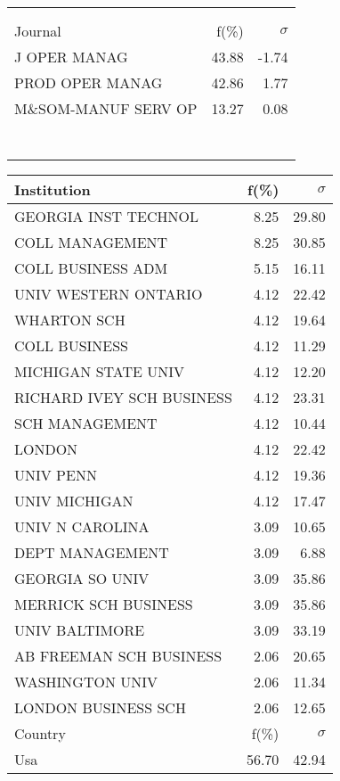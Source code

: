 \documentclass[a4paper,11pt]{report}
\begin{document}
\begin{landscape}
\begin{table}[!ht]
{\begin{tabular}{|l r r|}
 &  & \\
 &  & \\
\hline
\hline
Journal & f(\%) & $\sigma$\\
\hline
J OPER MANAG & 43.88 & -1.74\\
PROD OPER MANAG & 42.86 & 1.77\\
M\&SOM-MANUF SERV OP & 13.27 & 0.08\\
 &  & \\
 &  & \\
 &  & \\
 &  & \\
 &  & \\
 &  & \\
 &  & \\
\hline
\end{tabular}
}
{\scriptsize\begin{tabular}{|l r r|}
\hline
Institution & f(\%) & $\sigma$\\
\hline
GEORGIA INST TECHNOL & 8.25 & 29.80\\
COLL MANAGEMENT & 8.25 & 30.85\\
COLL BUSINESS ADM & 5.15 & 16.11\\
UNIV WESTERN ONTARIO & 4.12 & 22.42\\
WHARTON SCH & 4.12 & 19.64\\
COLL BUSINESS & 4.12 & 11.29\\
MICHIGAN STATE UNIV & 4.12 & 12.20\\
RICHARD IVEY SCH BUSINESS & 4.12 & 23.31\\
SCH MANAGEMENT & 4.12 & 10.44\\
LONDON & 4.12 & 22.42\\
UNIV PENN & 4.12 & 19.36\\
UNIV MICHIGAN & 4.12 & 17.47\\
UNIV N CAROLINA & 3.09 & 10.65\\
DEPT MANAGEMENT & 3.09 & 6.88\\
GEORGIA SO UNIV & 3.09 & 35.86\\
MERRICK SCH BUSINESS & 3.09 & 35.86\\
UNIV BALTIMORE & 3.09 & 33.19\\
AB FREEMAN SCH BUSINESS & 2.06 & 20.65\\
WASHINGTON UNIV & 2.06 & 11.34\\
LONDON BUSINESS SCH & 2.06 & 12.65\\
\hline
\hline
Country & f(\%) & $\sigma$\\
\hline
Usa & 56.70 & 42.94\\

\end{tabular}}
\end{table}
\end{landscape}
\end{document}
